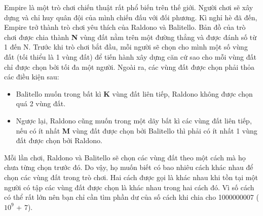 Empire là một trò chơi chiến thuật rất phổ biến trên thế giới. Người chơi sẽ xây dựng và chỉ huy quân đội của mình chiến đấu với đối phương. Kì nghỉ hè đã đến, Empire trở thành trò chơi yêu thích của Raldono và Balitello. Bản đồ của trò chơi được chia thành   \textbf{    N   }   vùng đất nằm trên một đường thẳng và được đánh số từ 1 đến N. Trước khi trò chơi bắt đầu, mỗi người sẽ chọn cho mình một số vùng đất (tối thiểu là 1 vùng đất) để tiến hành xây dựng căn cứ sao cho mỗi vùng đất chỉ được chọn bởi tối đa một người. Ngoài ra, các vùng đất được chọn phải thỏa các điều kiện sau:  
\begin{itemize}
	\item     Balitello muốn trong bất kì    \textbf{     K    }    vùng đất liên tiếp, Raldono không được chọn quá 2 vùng đất.   
	\item     Ngược lại, Raldono cũng muốn trong một dãy bất kì các vùng đất liên tiếp, nếu có ít nhất    \textbf{     M    }    vùng đất được chọn bởi Balitello thì phải có ít nhất 1 vùng đất được chọn bởi Raldono.   
\end{itemize}

   Mỗi lần chơi, Raldono và Balitello sẽ chọn các vùng đất theo một cách mà họ chưa từng chọn trước đó. Do vậy, họ muốn biết có bao nhiêu cách khác nhau để chọn các vùng đất trong trò chơi. Hai cách được gọi là khác nhau khi tồn tại một người có tập các vùng đất được chọn là khác nhau trong hai cách đó. Vì số cách có thể rất lớn nên bạn chỉ cần tìm phần dư của số cách khi chia cho 1000000007 ($10^{9}$   + 7).